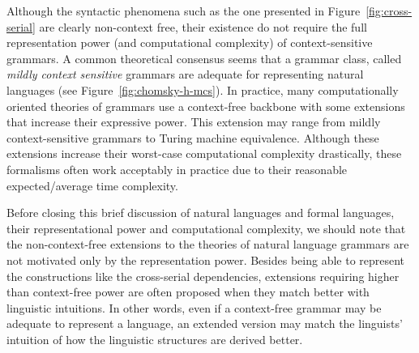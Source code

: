 Although the syntactic phenomena such as the one presented
in Figure~\ref{fig:cross-serial} are clearly non-context free,
their existence do not require the full representation power
(and computational complexity) of context-sensitive grammars.
A common theoretical consensus seems that
a grammar class, called \emph{mildly context sensitive} grammars
are adequate for representing natural languages
(see Figure~\ref{fig:chomsky-h-mcs}).
In practice,
many computationally oriented theories of grammars use
a context-free backbone with some extensions that increase their
expressive power.
This extension may range from mildly context-sensitive grammars%
to Turing machine equivalence.%
Although these extensions increase
their worst-case computational complexity drastically,
these formalisms often work acceptably in practice due to their
reasonable expected/average time complexity.


Before closing this brief discussion of natural languages
and formal languages,
their representational power and computational complexity,
we should note that the non-context-free extensions
to the theories of natural language grammars are not
motivated only by the representation power.
Besides being able to represent the constructions
like the cross-serial dependencies,
extensions requiring higher
than context-free power are often proposed
when they match better with linguistic intuitions.
In other words, even if a context-free grammar may be adequate
to represent a language,
an extended version may match the linguists' intuition
of how the linguistic structures are derived better.

\begin{marginfigure}
  \begin{center}
    \tikzset{external/export next=false}%
  \end{center}
  \caption{\label{fig:chomsky-h-mcs}%
    A depiction of Chomsky hierarchy of language classes
    (Figure~\ref{fig:chomsky-h},
    with the addition of \emph{mildly context-sensitive languages}
    represented with the dashed ellipse.
  }
\end{marginfigure}

